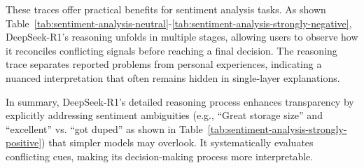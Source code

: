 \documentclass{IEEEcsmag}
\begin{document}
These traces offer practical benefits for sentiment analysis tasks. As shown Table~\ref{tab:sentiment-analysis-neutral}-\ref{tab:sentiment-analysis-strongly-negative}, DeepSeek-R1’s reasoning unfolds in multiple stages, allowing users to observe how it reconciles conflicting signals before reaching a final decision. The reasoning trace separates reported problems from personal experiences, indicating a nuanced interpretation that often remains hidden in single-layer explanations.

In summary, DeepSeek-R1’s detailed reasoning process enhances transparency by explicitly addressing sentiment ambiguities (e.g., ``Great storage size'' and ``excellent'' vs. ``got duped'' as shown in Table~\ref{tab:sentiment-analysis-strongly-positive}) that simpler models may overlook. It systematically evaluates conflicting cues, making its decision-making process more interpretable.
\end{document}
